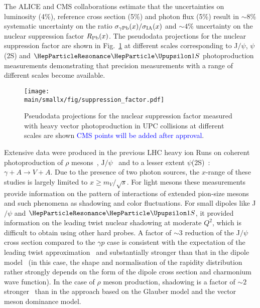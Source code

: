 \documentclass[../report.tex]{subfiles}
\providecommand{\main}{..}
\begin{document}
The ALICE and CMS collaborations estimate that the uncertainties on luminosity (4\%), reference cross section (5\%) and photon flux (5\%) result in $\sim8$\% systematic uncertainty on the ratio $\sigma_{\rm \gamma Pb}(x)/\sigma_{\rm IA}(x)$ and $\sim 4$\% uncertainty on the nuclear suppression factor $R_{\rm Pb} (x)$. The pseudodata projections for the nuclear suppression factor are shown in Fig.~\ref{fig:r} at different scales corresponding to J$/\psi$, $\psi$(2S) and $\PGUP{1S}$ photoproduction measurements demonstrating that precision measurements with a range of different scales become available. 

\begin{figure}
\centering
\texttt{[image: \\main/smallx/fig/suppression\_factor.pdf]}
\caption{Pseudodata projections for the nuclear suppression factor measured with heavy vector photoproduction in \PbPb UPC collisions at different scales are shown \textcolor{blue}{CMS points will be added after approval}.}
\label{fig:r}
\end{figure}


\label{sec:vmtheo}

Extensive data were produced in the previous LHC heavy ion Runs on coherent photoproduction  of $\rho$ mesons~\cite{Adam:2015gsa}, 
$\mathrm{J/}\psi$~\cite{Abbas:2013oua,Abelev:2012ba,Khachatryan:2016qhq} and to a lesser extent $\psi$(2S)~\cite{Adam:2015sia}: 
$\gamma+ A \to V +A$. Due to the presence of two photon sources, the $x$-range of these studies is largely  limited
to $x\ge m_V/\sqrt{s}$. For light mesons these measurements provide information on the pattern of interactions of extended pion-size mesons and such phenomena as shadowing and color fluctuations. For small dipoles like J$/\psi$ and $\PGUP{1S}$, 
it provided information on the leading twist nuclear shadowing at moderate $Q^2$, which is difficult to obtain using other hard probes. A factor of $\sim 3$ reduction of the J$/\psi$ 
cross section compared to the $\gamma p$ case is consistent with the expectation of the leading twist 
approximation~\cite{Guzey:2013xba,Guzey:2013qza} and substantially stronger than that in the dipole 
model~\cite{Lappi:2013am} (in this case, the shape and normalisation of the rapidity distribution rather 
strongly depends on the form of the dipole cross section and charmonium wave function).
In the case of $\rho$ meson production, shadowing is a factor of $\sim 2$ stronger~\cite{Frankfurt:2015cwa} than in the approach based on
the Glauber model and the vector meson dominance model.
\end{document}
